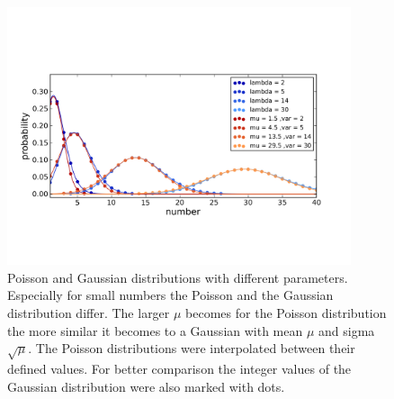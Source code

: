 \begin{figure}
\centering
\includegraphics[width = 0.9\textwidth]{pictures/poissgaussdistr.png}
	\caption{Poisson and Gaussian distributions with different parameters. Especially for small numbers the Poisson and the Gaussian distribution differ. The larger $\mu$ becomes for the Poisson distribution the more similar it becomes to a Gaussian with mean $\mu$ and sigma $\sqrt{\mu}$. The Poisson distributions were interpolated between their defined values. For better comparison the integer values of the Gaussian distribution were also marked with dots.}
	\label{poisgaussdistr}
\end{figure}

